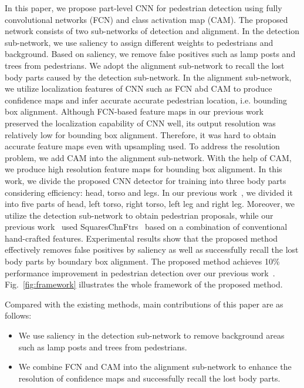 \documentclass[journal]{IEEEtran}
\begin{document}
In this paper, we propose part-level CNN for pedestrian detection using fully convolutional networks (FCN) and class activation map (CAM). The proposed network consists of two sub-networks of detection and alignment. In the detection sub-network, we use saliency to assign different weights to pedestrians and background. Based on saliency, we remove false positives such as lamp posts and trees from pedestrians. We adopt the alignment sub-network to recall the lost body parts caused by the detection sub-network. In the alignment sub-network, we utilize localization features of CNN such as FCN abd CAM to produce confidence maps and infer accurate accurate pedestrian location, i.e. bounding box alignment. Although FCN-based feature maps in our previous work~\cite{wang2017part} preserved the localization capability of CNN well, its output resolution was relatively low for bounding box alignment. Therefore, it was hard to obtain accurate feature maps even with upsampling used. To address the resolution problem, we add CAM into the alignment sub-network. With the help of CAM, we produce high resolution feature maps for bounding box alignment. In this work, we divide the proposed CNN detector for training into three body parts considering efficiency: head, torso and legs. In our previous work~\cite{wang2017part}, we divided it into five parts of head, left torso, right torso, left leg and right leg. Moreover, we utilize the detection sub-network to obtain pedestrian proposals, while our previous work~\cite{wang2017part} used SquaresChnFtrs~\cite{benenson2013seeking} based on a combination of conventional hand-crafted features. Experimental results show that the proposed method effectively removes false positives by saliency as well as successfully recall the lost body parts by boundary box alignment. The proposed method achieves 10\% performance improvement in pedestrian detection over our previous work~\cite{wang2017part}. Fig.~\ref{fig:framework} illustrates the whole framework of the proposed method. 

Compared with the existing methods, main contributions of this paper are as follows:

\begin{itemize}
\item[] We use saliency in the detection sub-network to remove background areas such as lamp posts and trees from pedestrians.
\item[] We combine FCN and CAM into the alignment sub-network to enhance the resolution of confidence maps and successfully recall the lost body parts.
\end{itemize}
\end{document}
